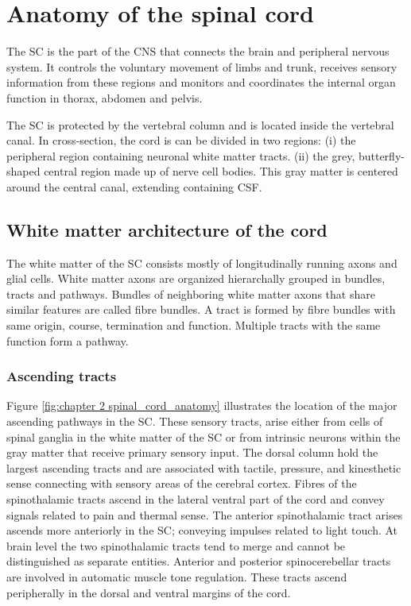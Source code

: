 \newcommand{\prot}{\ensuremath{\mathcal{P}}}

\section{Anatomy of the spinal cord}
The {\gls{SC}} is the part of the {\gls{CNS}} that connects the brain and peripheral nervous system. It controls the voluntary movement of limbs and trunk, receives sensory information from these regions and monitors and coordinates the internal organ function in thorax, abdomen and pelvis. 

The {\gls{SC}} is protected by the vertebral column and is located inside the vertebral canal. In cross-section, the cord is can be divided in two regions: (i) the peripheral region containing neuronal white matter tracts. (ii) the grey, butterfly-shaped central region made up of nerve cell bodies. This gray matter is centered around the central canal, extending containing \gls{CSF}.

\subsection*{White matter architecture of the cord}
The white matter of the {\gls{SC}} consists mostly of longitudinally running axons and glial cells. White matter axons are organized hierarchally grouped in bundles, tracts and pathways. Bundles of neighboring white matter axons that share similar features are called fibre bundles. A tract is formed by fibre bundles with same origin, course, termination and function. Multiple tracts with the same function form a pathway.

\subsubsection*{Ascending tracts}
\label{sec:chap2:ascendingtracts}
Figure \ref{fig:chapter 2 spinal_cord_anatomy} illustrates the location of the major ascending pathways in the {\gls{SC}}. These sensory tracts, arise either from cells of spinal ganglia in the white matter of the {\gls{SC}} or from intrinsic neurons within the gray matter that receive primary sensory input. The dorsal column hold the largest ascending tracts and are associated with tactile, pressure, and kinesthetic sense connecting with sensory areas of the cerebral cortex. Fibres of the spinothalamic tracts ascend in the lateral ventral part of the cord and convey signals related to pain and thermal sense. The anterior spinothalamic tract arises ascends more anteriorly in the {\gls{SC}}; conveying impulses related to light touch. At brain level the two spinothalamic tracts tend to merge and cannot be distinguished as separate entities. Anterior and posterior spinocerebellar tracts are involved in automatic muscle tone regulation. These tracts ascend peripherally in the dorsal and ventral margins of the cord.

